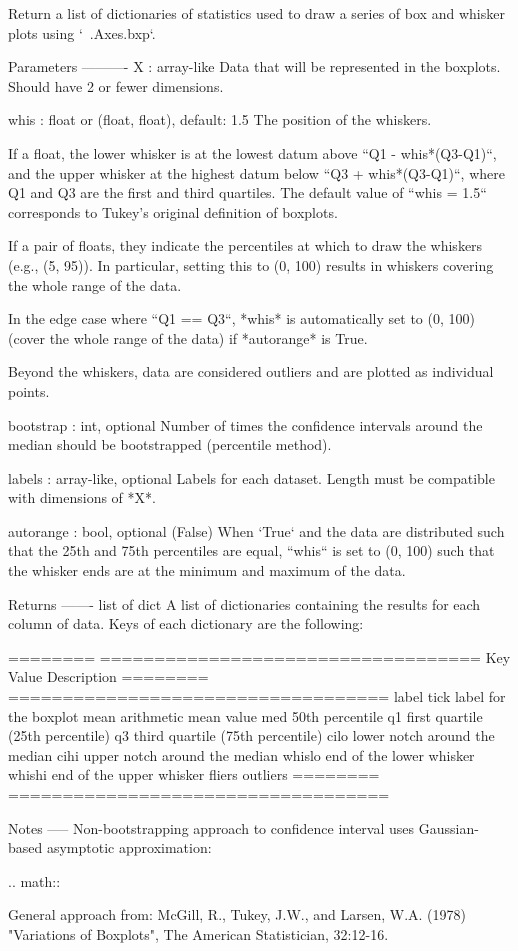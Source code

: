 \begin{DoxyVerb}Return a list of dictionaries of statistics used to draw a series of box
and whisker plots using `~.Axes.bxp`.

Parameters
----------
X : array-like
    Data that will be represented in the boxplots. Should have 2 or
    fewer dimensions.

whis : float or (float, float), default: 1.5
    The position of the whiskers.

    If a float, the lower whisker is at the lowest datum above
    ``Q1 - whis*(Q3-Q1)``, and the upper whisker at the highest datum below
    ``Q3 + whis*(Q3-Q1)``, where Q1 and Q3 are the first and third
    quartiles.  The default value of ``whis = 1.5`` corresponds to Tukey's
    original definition of boxplots.

    If a pair of floats, they indicate the percentiles at which to draw the
    whiskers (e.g., (5, 95)).  In particular, setting this to (0, 100)
    results in whiskers covering the whole range of the data.

    In the edge case where ``Q1 == Q3``, *whis* is automatically set to
    (0, 100) (cover the whole range of the data) if *autorange* is True.

    Beyond the whiskers, data are considered outliers and are plotted as
    individual points.

bootstrap : int, optional
    Number of times the confidence intervals around the median
    should be bootstrapped (percentile method).

labels : array-like, optional
    Labels for each dataset. Length must be compatible with
    dimensions of *X*.

autorange : bool, optional (False)
    When `True` and the data are distributed such that the 25th and 75th
    percentiles are equal, ``whis`` is set to (0, 100) such that the
    whisker ends are at the minimum and maximum of the data.

Returns
-------
list of dict
    A list of dictionaries containing the results for each column
    of data. Keys of each dictionary are the following:

    ========   ===================================
    Key        Value Description
    ========   ===================================
    label      tick label for the boxplot
    mean       arithmetic mean value
    med        50th percentile
    q1         first quartile (25th percentile)
    q3         third quartile (75th percentile)
    cilo       lower notch around the median
    cihi       upper notch around the median
    whislo     end of the lower whisker
    whishi     end of the upper whisker
    fliers     outliers
    ========   ===================================

Notes
-----
Non-bootstrapping approach to confidence interval uses Gaussian-based
asymptotic approximation:

.. math::

      \times {}

General approach from:
McGill, R., Tukey, J.W., and Larsen, W.A. (1978) "Variations of
Boxplots", The American Statistician, 32:12-16.
\end{DoxyVerb}
